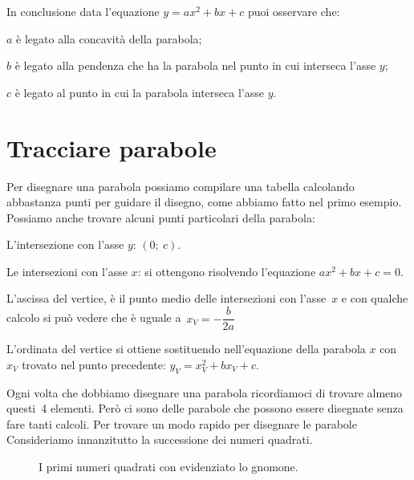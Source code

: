 In conclusione data l'equazione \(y=ax^2+bx+c\) puoi osservare che:
\begin{enumerate*}
 \item \(a\) è legato alla concavità della parabola;
 \item \(b\) è legato alla pendenza che ha la parabola nel punto in cui
  interseca l'asse \(y\);
 \item \(c\) è legato al punto in cui la parabola interseca l'asse \(y\).
\end{enumerate*}

\section{Tracciare parabole}
\label{sec:parabola_disegno}

Per disegnare una parabola possiamo compilare una tabella calcolando
abbastanza punti per guidare il disegno, come abbiamo fatto nel primo
esempio.
Possiamo anche trovare alcuni punti particolari della parabola:

\begin{enumerate*}
 \item L'intersezione con l'asse \(y\): \((0;~c)\).
 \item Le intersezioni con l'asse \(x\): si ottengono risolvendo l'equazione
  \(ax^2+bx+c=0\).
 \item L'ascissa del vertice, è il punto medio delle intersezioni con
  l'asse~\(x\) e con qualche calcolo si può vedere che è uguale
  a~\(x_V=-\dfrac{b}{2a}\)
 \item L'ordinata del vertice si ottiene sostituendo nell'equazione della
  parabola \(x\) con \(x_V\) trovato nel punto precedente: \(y_V=x_V^2+bx_V+c\).
\end{enumerate*}

Ogni volta che dobbiamo disegnare una parabola ricordiamoci di trovare almeno
questi~4 elementi. Però ci sono delle parabole che possono essere disegnate
senza fare tanti calcoli. Per trovare un modo rapido per disegnare le parabole
Consideriamo innanzitutto la successione dei numeri quadrati.

 \begin{inaccessibleblock}
\begin{figure}[h]
\begin{center} \scalebox{1.0}{\quadrati} \end{center}
  \caption{I primi numeri quadrati con evidenziato lo gnomone.}
  \label{fig:parabola_quadrati}
\end{figure}
\end{inaccessibleblock}


